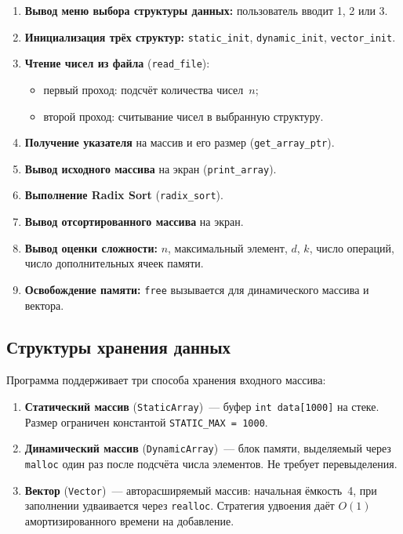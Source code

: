 \documentclass[a4paper,14pt]{extarticle}
\begin{document}
\begin{enumerate}
  \item \textbf{Вывод меню выбора структуры данных:} пользователь вводит 1, 2 или 3.

  \item \textbf{Инициализация трёх структур:} \texttt{static\_init}, \texttt{dynamic\_init}, \texttt{vector\_init}.

  \item \textbf{Чтение чисел из файла} (\texttt{read\_file}):
  \begin{itemize}
    \item первый проход: подсчёт количества чисел~$n$;
    \item второй проход: считывание чисел в выбранную структуру.
  \end{itemize}

  \item \textbf{Получение указателя} на массив и его размер (\texttt{get\_array\_ptr}).

  \item \textbf{Вывод исходного массива} на экран (\texttt{print\_array}).

  \item \textbf{Выполнение Radix Sort} (\texttt{radix\_sort}).

  \item \textbf{Вывод отсортированного массива} на экран.

  \item \textbf{Вывод оценки сложности:} $n$, максимальный элемент, $d$, $k$, число операций, число дополнительных ячеек памяти.

  \item \textbf{Освобождение памяти:} \texttt{free} вызывается для динамического массива и вектора.
\end{enumerate}

\subsection{Структуры хранения данных}

Программа поддерживает три способа хранения входного массива:

\begin{enumerate}
  \item \textbf{Статический массив} (\texttt{StaticArray})~--- буфер \texttt{int data[1000]} на стеке. Размер ограничен константой \texttt{STATIC\_MAX = 1000}.

  \item \textbf{Динамический массив} (\texttt{DynamicArray})~--- блок памяти, выделяемый через \texttt{malloc} один раз после подсчёта числа элементов. Не требует перевыделения.

  \item \textbf{Вектор} (\texttt{Vector})~--- авторасширяемый массив: начальная ёмкость~4, при заполнении удваивается через \texttt{realloc}. Стратегия удвоения даёт $O(1)$ амортизированного времени на добавление.
\end{enumerate}
\end{document}

